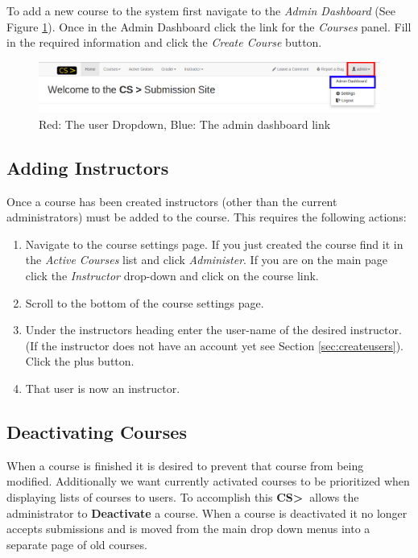 \documentclass[11pt]{report}
\newcommand{\csgt}[0]{\textbf{CS\textgreater\ }}
\begin{document}
To add a new course to the system first navigate to the \emph{Admin Dashboard} (See Figure \ref{fig:admindash}).
Once in the Admin Dashboard click the link for the \emph{Courses} panel. Fill in the required information and
click the \emph{Create Course} button.

\begin{figure}
\centering
\includegraphics[width=\textwidth,height=\textheight,keepaspectratio]{diagrams/admin_header}
\caption{Red: The user Dropdown, Blue: The admin dashboard link}
\label{fig:admindash}
\end{figure}

\subsection{Adding Instructors}
Once a course has been created instructors (other than the current administrators) must be added to the course.
This requires the following actions:
\begin{enumerate}
\item Navigate to the course settings page. If you just created the course find it in the \emph{Active Courses}
list and click \emph{Administer}. If you are on the main page click the \emph{Instructor} drop-down and click on
the course link.
\item Scroll to the bottom of the course settings page. 
\item Under the instructors heading enter the user-name of the desired instructor. (If the instructor does not have an account yet see Section \ref{sec:createusers}). Click the plus button. 
\item That user is now an instructor.
\end{enumerate}

\subsection{Deactivating Courses}
When a course is finished it is desired to prevent that course from being modified. Additionally we want
currently activated courses to be prioritized when displaying lists of courses to users. 
To accomplish this \csgt allows the administrator to \textbf{Deactivate} a course. When a course is deactivated
it no longer accepts submissions and is moved from the main drop down menus into a separate page of old courses.
\end{document}
